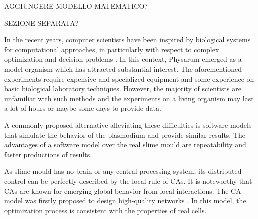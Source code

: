 \par
AGGIUNGERE MODELLO MATEMATICO?
\par

\par
SEZIONE SEPARATA?
\par
In the recent years, computer scientists have been inspired by biological systems for computational approaches, in particularly with respect to complex optimization and decision problems \cite{grube2016physarum}. In this context, Physarum emerged as a model organism which has attracted substantial interest. The aforementioned experiments require expensive and specialized equipment and some experience on basic biological laboratory techniques. However, the majority of scientists are unfamiliar with such methods and the experiments on a living organism may last a lot of hours or maybe some days to provide data.
\par
A commonly proposed alternative alleviating these difficulties is software models that simulate the behavior of the plasmodium and provide similar results. The advantages of a software model over the real slime mould are repeatability and faster productions of results.
\par
As slime mould has no brain or any central processing system, its distributed control can be perfectly described by the local rule of CAs. It is noteworthy that CAs are known for emerging global behavior from local interactions. The CA model was firstly proposed to design high-quality networks \cite{gunji2008minimal}. In this model, the optimization process is consistent with the properties of real cells. 
